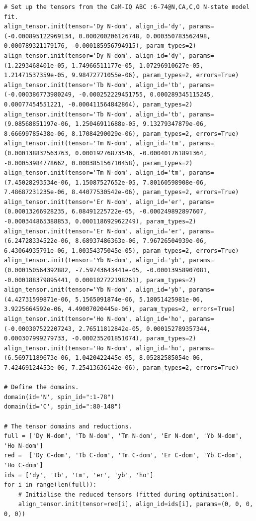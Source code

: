\begin{lstlisting}
# Set up the tensors from the CaM-IQ ABC :6-74@N,CA,C,O N-state model fit.
align_tensor.init(tensor='Dy N-dom', align_id='dy', params=(-0.000895122969134, 0.000200206126748, 0.000350783562498, 0.000789321179176, -0.000185956794915), param_types=2)
align_tensor.init(tensor='Dy N-dom', align_id='dy', params=(1.2293468401e-05, 1.74966511177e-05, 1.07296910627e-05, 1.21471537359e-05, 9.98472771055e-06), param_types=2, errors=True)
align_tensor.init(tensor='Tb N-dom', align_id='tb', params=(-0.000386773980249, -0.000252229451755, 0.000289345115245, 0.00077454551221, -0.000411564842864), param_types=2)
align_tensor.init(tensor='Tb N-dom', align_id='tb', params=(9.08568851197e-06, 1.25046911688e-05, 9.13279347879e-06, 8.66699785438e-06, 8.17084290029e-06), param_types=2, errors=True)
align_tensor.init(tensor='Tm N-dom', align_id='tm', params=(0.000138832563763, 0.00019276873546, -0.000401761891364, -0.00053984778662, 0.000385156710458), param_types=2)
align_tensor.init(tensor='Tm N-dom', align_id='tm', params=(7.45028293534e-06, 1.15087527652e-05, 7.80160598908e-06, 7.48687231235e-06, 8.44077530542e-06), param_types=2, errors=True)
align_tensor.init(tensor='Er N-dom', align_id='er', params=(0.00013266928235, 6.08491225722e-05, -0.000249892897607, -0.000344865388853, 0.000118692962249), param_types=2)
align_tensor.init(tensor='Er N-dom', align_id='er', params=(6.24728334522e-06, 8.68937486363e-06, 7.96726504939e-06, 6.43064935791e-06, 1.00354375045e-05), param_types=2, errors=True)
align_tensor.init(tensor='Yb N-dom', align_id='yb', params=(0.000150564392882, -7.59743643441e-05, -0.00013958907081, -0.000188379895441, 0.000102722198261), param_types=2)
align_tensor.init(tensor='Yb N-dom', align_id='yb', params=(4.42731599871e-06, 5.1565091874e-06, 5.18051425981e-06, 3.9225664592e-06, 4.49007020445e-06), param_types=2, errors=True)
align_tensor.init(tensor='Ho N-dom', align_id='ho', params=(-0.000307522207243, 2.76511812842e-05, 0.000152789357344, 0.000307999279733, -0.000235201851074), param_types=2)
align_tensor.init(tensor='Ho N-dom', align_id='ho', params=(6.56971189673e-06, 1.0420422445e-05, 8.05282585054e-06, 7.42469124453e-06, 7.25413636142e-06), param_types=2, errors=True)

# Define the domains.
domain(id='N', spin_id=":1-78")
domain(id='C', spin_id=":80-148")

# The tensor domains and reductions.
full = ['Dy N-dom', 'Tb N-dom', 'Tm N-dom', 'Er N-dom', 'Yb N-dom', 'Ho N-dom']
red =  ['Dy C-dom', 'Tb C-dom', 'Tm C-dom', 'Er C-dom', 'Yb C-dom', 'Ho C-dom']
ids = ['dy', 'tb', 'tm', 'er', 'yb', 'ho']
for i in range(len(full)):
    # Initialise the reduced tensors (fitted during optimisation).
    align_tensor.init(tensor=red[i], align_id=ids[i], params=(0, 0, 0, 0, 0))


\end{lstlisting}
